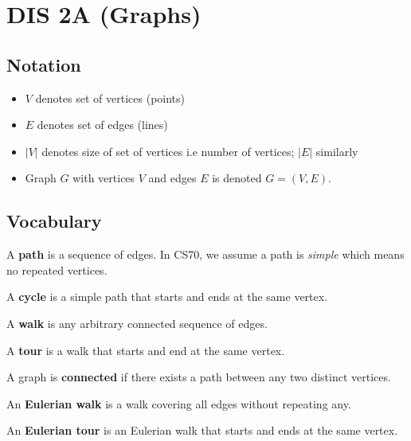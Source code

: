 \section{DIS 2A (Graphs)}

\subsection{Notation}
\begin{itemize}
    \item $V$ denotes set of vertices (points)
    \item $E$ denotes set of edges (lines)
    \item $|V|$ denotes size of set of vertices i.e number of vertices; $|E|$ similarly
    \item Graph $G$ with vertices $V$ and edges $E$ is denoted $G = (V,E)$. 
\end{itemize}

\subsection{Vocabulary}

\begin{definition}[Path]
    A \textbf{path} is a sequence of edges. In CS70, we assume a path is \textit{simple} which means no repeated vertices. 
\end{definition}
\begin{definition}[Cycle]
    A \textbf{cycle} is a simple path that starts and ends at the same vertex. 
\end{definition}
\begin{definition}[Walk]
    A \textbf{walk} is any arbitrary connected sequence of edges. 
\end{definition}
\begin{definition}[Tour]
    A \textbf{tour} is a walk that starts and end at the same vertex. 
\end{definition}
\begin{definition}[Connected]
    A graph is \textbf{connected} if there exists a path between any two distinct vertices. 
\end{definition}
\begin{definition}
    An \textbf{Eulerian walk} is a walk covering all edges without repeating any. 
\end{definition}
\begin{definition}
    An \textbf{Eulerian tour} is an Eulerian walk that starts and ends at the same vertex. 
\end{definition}

